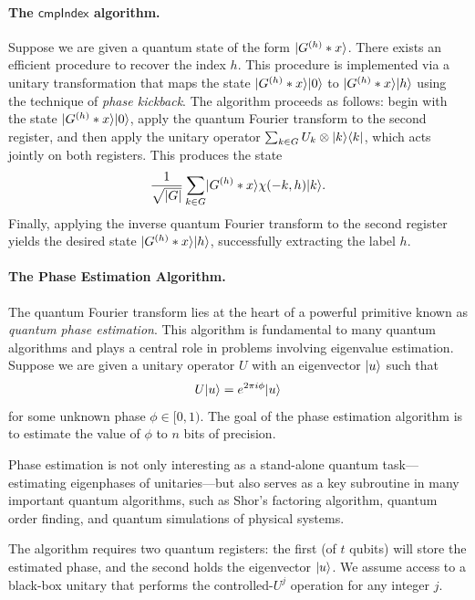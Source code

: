 \documentclass[12pt]{report}
\newcommand{\comph}{\mathsf{cmpIndex}}
\begin{document}
\paragraph{The $\comph$ algorithm.}
Suppose we are given a quantum state of the form $\lvert G^{(h)} * x\rangle$. There exists an efficient procedure to recover the index $h$. This procedure is implemented via a unitary transformation that maps the state $\lvert G^{(h)} * x\rangle \lvert0\rangle$ to $\lvert G^{(h)} * x\rangle \lvert h\rangle$ using the technique of \emph{phase kickback}. The algorithm proceeds as follows: begin with the state $\lvert G^{(h)} * x\rangle \lvert0\rangle$, apply the quantum Fourier transform to the second register, and then apply the unitary operator $\sum_{k \in G} U_k \otimes \lvert k\rangle \langle k\rvert$, which acts jointly on both registers. This produces the state
\[
\frac{1}{\sqrt{\lvert G\rvert}} \sum_{k \in G} \lvert G^{(h)} * x\rangle \chi(-k, h) \lvert k\rangle.
\]
Finally, applying the inverse quantum Fourier transform to the second register yields the desired state $\lvert G^{(h)} * x\rangle \lvert h\rangle$, successfully extracting the label $h$.

\paragraph{The Phase Estimation Algorithm.}

The quantum Fourier transform lies at the heart of a powerful primitive known as \emph{quantum phase estimation}. This algorithm is fundamental to many quantum algorithms and plays a central role in problems involving eigenvalue estimation. Suppose we are given a unitary operator $U$ with an eigenvector $\lvert u\rangle$ such that
\[
U \lvert u\rangle = e^{2\pi i \phi} \lvert u\rangle
\]
for some unknown phase $\phi \in [0, 1)$. The goal of the phase estimation algorithm is to estimate the value of $\phi$ to $n$ bits of precision.

Phase estimation is not only interesting as a stand-alone quantum task—estimating eigenphases of unitaries—but also serves as a key subroutine in many important quantum algorithms, such as Shor’s factoring algorithm, quantum order finding, and quantum simulations of physical systems.

The algorithm requires two quantum registers: the first (of $t$ qubits) will store the estimated phase, and the second holds the eigenvector $\lvert u\rangle$. We assume access to a black-box unitary that performs the controlled-$U^j$ operation for any integer $j$.
\end{document}
